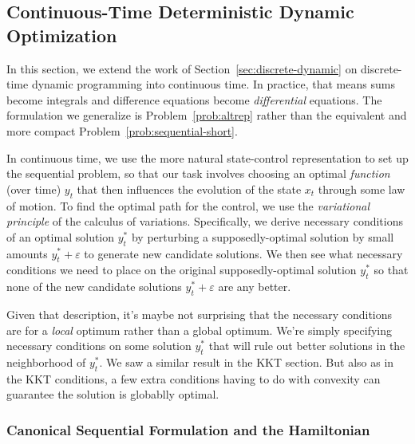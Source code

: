 \documentclass[12pt]{article}
\numberwithin{equation}{section} %
\theoremstyle{plain}
\theoremstyle{definition}
\theoremstyle{remark}
\begin{document}
\clearpage
\subsection{Continuous-Time Deterministic Dynamic Optimization}
\label{sec:continuous-dynamic}

In this section, we extend the work of
Section~\ref{sec:discrete-dynamic} on discrete-time dynamic programming
into continuous time. In practice, that means sums become integrals and
difference equations become \emph{differential} equations.  The
formulation we generalize is Problem~\ref{prob:altrep} rather than the
equivalent and more compact Problem~\ref{prob:sequential-short}.

In continuous time, we use the more natural state-control representation
to set up the sequential problem, so that our task involves choosing an
optimal \emph{function} (over time) $y_t$ that then influences the
evolution of the state $x_t$ through some law of motion.
To find the optimal path for the control, we use the
\emph{variational principle} of the calculus of variations.
Specifically, we derive necessary conditions of an optimal solution
$y_t^*$ by perturbing a supposedly-optimal solution by small amounts
$y^*_t+\varepsilon$ to generate new candidate solutions.
We then see what necessary conditions we need to place on the original
supposedly-optimal solution $y^*_t$ so that none of the new candidate
solutions $y^*_t+\varepsilon$ are any better.

Given that description, it's maybe not surprising that the necessary
conditions are for a \emph{local} optimum rather than a global optimum.
We're simply specifying necessary conditions on some solution $y_t^*$
that will rule out better solutions in the neighborhood of $y_t^*$. We
saw a similar result in the KKT section. But also as in the KKT
conditions, a few extra conditions having to do with convexity can
guarantee the solution is globablly optimal.

\subsubsection{Canonical Sequential Formulation and the Hamiltonian}
\end{document}

